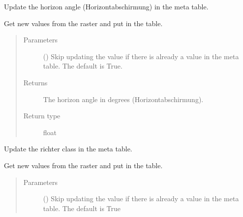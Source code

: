 \documentclass[letterpaper,10pt,english]{sphinxmanual}
\begin{document}
\begin{fulllineitems}
\begin{fulllineitems}
\label{\detokenize{weatherDB:weatherDB.station.PrecipitationStation.update_horizon}}
\sphinxAtStartPar
Update the horizon angle (Horizontabschirmung) in the meta table.

\sphinxAtStartPar
Get new values from the raster and put in the table.
\begin{quote}\begin{description}
\item[{Parameters}] \leavevmode
\sphinxAtStartPar
{} (\sphinxstyleliteralemphasis{\sphinxupquote{, }}) \textendash{} Skip updating the value if there is already a value in the meta table.
The default is True.

\item[{Returns}] \leavevmode
\sphinxAtStartPar
The horizon angle in degrees (Horizontabschirmung).

\item[{Return type}] \leavevmode
\sphinxAtStartPar
float

\end{description}\end{quote}

\end{fulllineitems}


\begin{fulllineitems}
\label{\detokenize{weatherDB:weatherDB.station.PrecipitationStation.update_richter_class}}
\sphinxAtStartPar
Update the richter class in the meta table.

\sphinxAtStartPar
Get new values from the raster and put in the table.
\begin{quote}\begin{description}
\item[{Parameters}] \leavevmode
\sphinxAtStartPar
{} (\sphinxstyleliteralemphasis{\sphinxupquote{, }}) \textendash{} Skip updating the value if there is already a value in the meta table.
The default is True


\end{description}
\end{quote}
\end{fulllineitems}
\end{fulllineitems}
\end{document}
